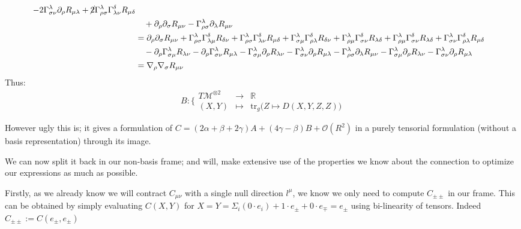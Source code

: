 \documentclass[a4paper,11pt]{article}
\begin{document}
\begin{align*}
    -2 \Gamma_{\sigma\nu}^\lambda \partial_\rho R_{\mu\lambda}
    +\cancel{2} \Gamma_{\rho\sigma}^\lambda \Gamma_{\lambda\nu}^\delta R_{\mu\delta}\\
    &\quad  + \partial_\rho\partial_\sigma R_{\mu\nu}
    - \Gamma_{\rho\sigma}^\lambda \partial_\lambda R_{\mu\nu}\\
    &= \partial_\rho\partial_\sigma R_{\mu\nu}
    + \Gamma_{\rho\sigma}^\lambda \Gamma_{\lambda\mu}^\delta R_{\delta\nu}
    + \Gamma_{\rho\sigma}^\lambda \Gamma_{\lambda\nu}^\delta R_{\mu\delta}
    + \Gamma_{\sigma\mu}^\lambda\Gamma_{\rho\lambda}^\delta R_{\delta\nu}
    + \Gamma_{\rho\mu}^\lambda\Gamma_{\sigma\nu}^\delta R_{\lambda\delta}
    + \Gamma_{\rho\mu}^\lambda\Gamma_{\sigma\nu}^\delta R_{\lambda\delta}
    + \Gamma_{\sigma\nu}^\lambda \Gamma_{\rho\lambda}^\delta R_{\mu\delta}\\
    &\quad - \partial_\rho \Gamma_{\sigma\mu}^\lambda R_{\lambda\nu}
    - \partial_\rho \Gamma_{\sigma\nu}^\lambda R_{\mu\lambda}
    - \Gamma_{\sigma\mu}^\lambda \partial_\rho R_{\lambda\nu}
    - \Gamma_{\sigma\nu}^\lambda \partial_\rho R_{\mu\lambda}
    - \Gamma_{\rho\sigma}^\lambda \partial_\lambda R_{\mu\nu}
    - \Gamma_{\sigma\mu}^\lambda \partial_\rho R_{\lambda\nu}
    - \Gamma_{\sigma\nu}^\lambda \partial_\rho R_{\mu\lambda}\\
    &= \nabla_\rho \nabla_\sigma R_{\mu\nu}
\end{align*}
Thus:
\begin{equation}
    B:\bigg\{ \begin{matrix}
        T\mathcal{M}^{\otimes 2} & \to & \mathbb{R}\\
        (X,Y) & \mapsto & \mathrm{tr}_g \big(Z \mapsto D(X,Y,Z,Z)\big)
    \end{matrix}
\end{equation}

However ugly this is; it gives a formulation of $C=(2\alpha + \beta + 2\gamma) A +(4\gamma- \beta) B + \mathcal{O}(R^2)$ in a purely tensorial formulation (without a basis representation) through its image.

We can now split it back in our non-basis frame; and will, make extensive use of the properties we know about the connection to optimize our expressions as much as possible.

Firstly, as we already know we will contract $C_{\mu\nu}$ with a single null direction $l^\mu$, we know we only need to compute $C_{\pm\pm}$ in our frame.
This can be obtained by simply evaluating $C(X,Y)$ for $X=Y=\Sigma_i(0\cdot e_i) + 1 \cdot e_\pm + 0 \cdot e_\mp = e_\pm$ using bi-linearity of tensors. Indeed $C_{\pm\pm}:=C(e_\pm,e_\pm)$
\end{document}
